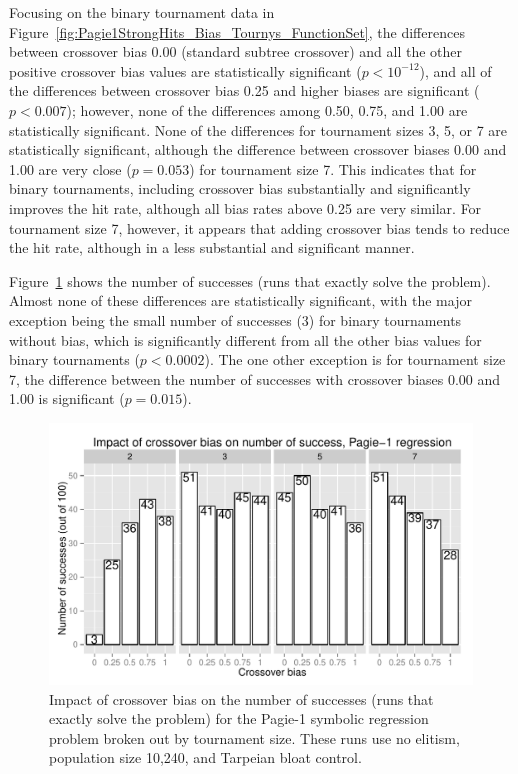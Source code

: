 \documentclass{sig-alternate}
\begin{document}
Focusing on the binary tournament data in Figure~\ref{fig:Pagie1StrongHits_Bias_Tournys_FunctionSet}, the differences
between crossover bias 0.00 (standard subtree crossover) and all the other positive crossover bias values are
statistically significant ($p<10^{-12}$), and all of the differences between crossover bias 0.25 and higher biases are
significant ($p<0.007$); however, none of the differences among 0.50, 0.75, and 1.00 are statistically significant.
None of the differences for tournament sizes 3, 5, or 7 are statistically significant, although the difference between
crossover biases 0.00 and 1.00 are very close ($p=0.053$) for tournament size 7. This indicates that for binary
tournaments, including crossover bias substantially and significantly improves the hit rate, although all bias rates
above 0.25 are very similar. For tournament size 7, however, it appears that adding crossover bias tends to reduce the
hit rate, although in a less substantial and significant manner.

%
%
%
%

Figure~\ref{fig:Pagie1StrongSuccesses} shows the number of successes (runs that exactly solve the problem). Almost none
of these differences are statistically significant, with the major exception being the small number of successes (3)
for binary tournaments without bias, which is significantly different from all the other bias values for binary
tournaments ($p<0.0002$). The one other exception is for tournament size 7, the difference between the number of
successes with crossover biases 0.00 and 1.00 is significant ($p=0.015$).

\begin{figure}
\centering
\includegraphics[width=0.45 \textwidth]{Plots/Pagie_1_Strong_Successes_vs_Bias.pdf}
\caption{Impact of crossover bias on the number of successes (runs that exactly solve the problem) for the Pagie-1
symbolic regression problem broken out by tournament size. These runs use 
no elitism, population size 10,240, and Tarpeian bloat control.}
\label{fig:Pagie1StrongSuccesses}
\end{figure}
\end{document}
